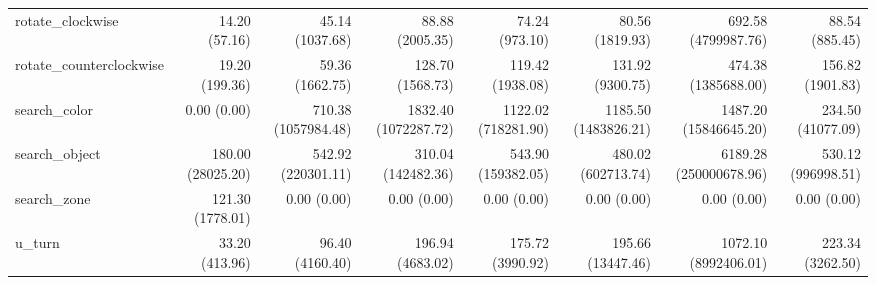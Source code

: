 \begin{table}[t]
{\begin{tabular}{lrrrrrrr}
rotate\_clockwise & 14.20 (57.16) & 45.14 (1037.68) & 88.88 (2005.35) & 74.24 (973.10) & 80.56 (1819.93) & 692.58 (4799987.76) & 88.54 (885.45) \\
rotate\_counterclockwise & 19.20 (199.36) & 59.36 (1662.75) & 128.70 (1568.73) & 119.42 (1938.08) & 131.92 (9300.75) & 474.38 (1385688.00) & 156.82 (1901.83) \\
search\_color & 0.00 (0.00) & 710.38 (1057984.48) & 1832.40 (1072287.72) & 1122.02 (718281.90) & 1185.50 (1483826.21) & 1487.20 (15846645.20) & 234.50 (41077.09) \\
search\_object & 180.00 (28025.20) & 542.92 (220301.11) & 310.04 (142482.36) & 543.90 (159382.05) & 480.02 (602713.74) & 6189.28 (250000678.96) & 530.12 (996998.51) \\
search\_zone & 121.30 (1778.01) & 0.00 (0.00) & 0.00 (0.00) & 0.00 (0.00) & 0.00 (0.00) & 0.00 (0.00) & 0.00 (0.00) \\
u\_turn & 33.20 (413.96) & 96.40 (4160.40) & 196.94 (4683.02) & 175.72 (3990.92) & 195.66 (13447.46) & 1072.10 (8992406.01) & 223.34 (3262.50) \\
\hline
\end{tabular}}
\end{table}
